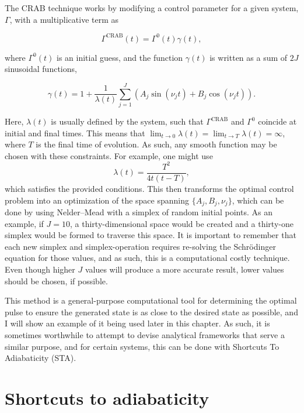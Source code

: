 The CRAB technique works by modifying a control parameter for a given system, $\Gamma$, with a multiplicative term as

\begin{equation}
\Gamma^{\text{CRAB}}(t) = \Gamma^0(t)\gamma(t),
\end{equation}

\noindent where $\Gamma^0(t)$ is an initial guess, and the function $\gamma(t)$ is written as a sum of $2J$ sinusoidal functions,

\begin{equation}
\gamma(t)=1+\frac{1}{\lambda(t)}\sum_{j=1}^J(A_j \sin(\nu_jt) + B_j\cos(\nu_jt)).
\end{equation}

\noindent Here, $\lambda(t)$ is usually defined by the system, such that $\Gamma^{\text{CRAB}}$ and $\Gamma^0$ coincide at initial and final times.
This means that $\lim_{t\rightarrow 0} \lambda(t) = \lim_{t\rightarrow T}\lambda(t) = \infty$, where $T$ is the final time of evolution.
As such, any smooth function may be chosen with these constraints.
For example, one might use
\begin{equation}
\lambda(t) = \frac{T^2}{4t(t-T)},
\end{equation}
\noindent which satisfies the provided conditions.
This then transforms the optimal control problem into an optimization of the space spanning $\{A_j, B_j, \nu_j\}$, which can be done by using Nelder--Mead with a simplex of random initial points.
As an example, if $J = 10$, a thirty-dimensional space would be created and a thirty-one simplex would be formed to traverse this space.
It is important to remember that each new simplex and simplex-operation requires re-solving the Schr\"odinger equation for those values, and as such, this is a computational costly technique.
Even though higher $J$ values will produce a more accurate result, lower values should be chosen, if possible.

This method is a general-purpose computational tool for determining the optimal pulse to ensure the generated state is as close to the desired state as possible, and I will show an example of it being used later in this chapter.
As such, it is sometimes worthwhile to attempt to devise analytical frameworks that serve a similar purpose, and for certain systems, this can be done with Shortcuts To Adiabaticity (STA).

\section{Shortcuts to adiabaticity}

